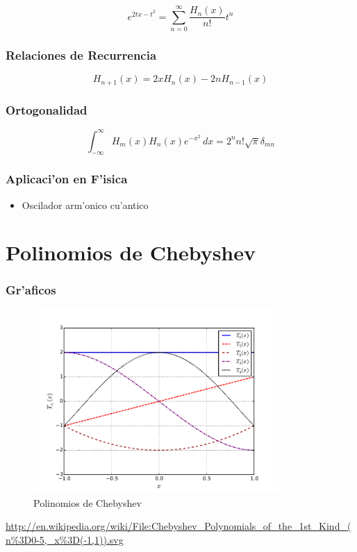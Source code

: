 \begin{equation}
e^{2tx-t^{2}}=\sum_{n=0}^{\infty}\frac{H_{n}(x)}{n!}t^{n}
\end{equation}

\subsubsection{Relaciones de Recurrencia}

\begin{equation}
H_{n+1}(x)=2xH_{n}(x)-2nH_{n-1}(x)
\end{equation}

\subsubsection{Ortogonalidad}
\begin{equation}
\int_{-\infty}^{\infty}H_{m}(x)H_{n}(x)e^{-x^{2}}\,dx=2^{n}n!\sqrt{\pi}\delta_{mn}
\end{equation}

\subsubsection{Aplicaci'on en F'isica}
\begin{itemize}
\item Oscilador arm'onico cu'antico
\end{itemize}

\newpage
\section{Polinomios de Chebyshev}
\subsubsection{Gr'aficos}
\begin{figure}[!h]
\centerline{\includegraphics[height=7cm]{figs/fig-Chebyshev.pdf}}
\caption{Polinomios de Chebyshev}
\end{figure}
\url{http://en.wikipedia.org/wiki/File:Chebyshev_Polynomials_of_the_1st_Kind_(n\%3D0-5,_x\%3D(-1,1)).svg}


